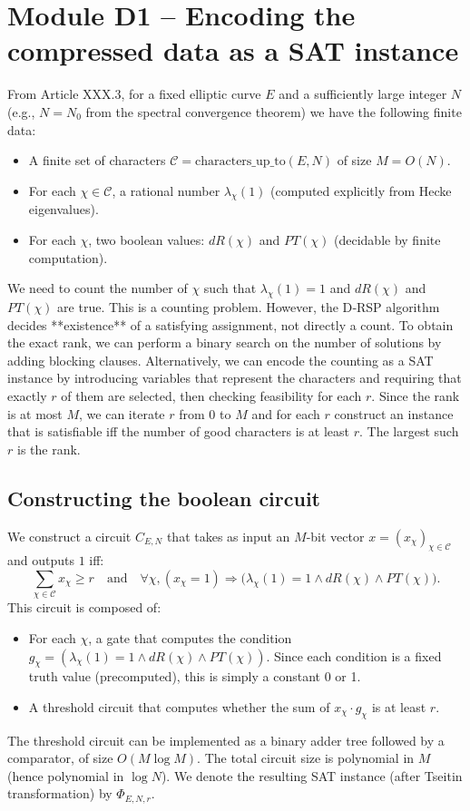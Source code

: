 \documentclass[11pt,a4paper]{article}
\begin{document}
\section{Module D1 – Encoding the compressed data as a SAT instance}

From Article XXX.3, for a fixed elliptic curve \(E\) and a sufficiently large integer \(N\) (e.g., \(N = N_0\) from the spectral convergence theorem) we have the following finite data:
\begin{itemize}
\item A finite set of characters \(\mathcal{C} = \text{characters\_up\_to}(E,N)\) of size \(M = O(N)\).
\item For each \(\chi \in \mathcal{C}\), a rational number \(\lambda_\chi(1)\) (computed explicitly from Hecke eigenvalues).
\item For each \(\chi\), two boolean values: \(dR(\chi)\) and \(PT(\chi)\) (decidable by finite computation).
\end{itemize}

We need to count the number of \(\chi\) such that \(\lambda_\chi(1)=1\) and \(dR(\chi)\) and \(PT(\chi)\) are true. This is a counting problem. However, the D‑RSP algorithm decides **existence** of a satisfying assignment, not directly a count. To obtain the exact rank, we can perform a binary search on the number of solutions by adding blocking clauses. Alternatively, we can encode the counting as a SAT instance by introducing variables that represent the characters and requiring that exactly \(r\) of them are selected, then checking feasibility for each \(r\). Since the rank is at most \(M\), we can iterate \(r\) from \(0\) to \(M\) and for each \(r\) construct an instance that is satisfiable iff the number of good characters is at least \(r\). The largest such \(r\) is the rank.

\subsection{Constructing the boolean circuit}

We construct a circuit \(C_{E,N}\) that takes as input an \(M\)-bit vector \(x = (x_\chi)_{\chi\in\mathcal{C}}\) and outputs \(1\) iff:
\[
\sum_{\chi \in \mathcal{C}} x_\chi \ge r \quad\text{and}\quad \forall \chi, (x_\chi = 1) \Rightarrow \bigl(\lambda_\chi(1)=1 \land dR(\chi) \land PT(\chi)\bigr).
\]
This circuit is composed of:
\begin{itemize}
\item For each \(\chi\), a gate that computes the condition \(g_\chi = (\lambda_\chi(1)=1 \land dR(\chi) \land PT(\chi))\). Since each condition is a fixed truth value (precomputed), this is simply a constant 0 or 1.
\item A threshold circuit that computes whether the sum of \(x_\chi \cdot g_\chi\) is at least \(r\).
\end{itemize}
The threshold circuit can be implemented as a binary adder tree followed by a comparator, of size \(O(M \log M)\). The total circuit size is polynomial in \(M\) (hence polynomial in \(\log N\)). We denote the resulting SAT instance (after Tseitin transformation) by \(\Phi_{E,N,r}\).
\end{document}
